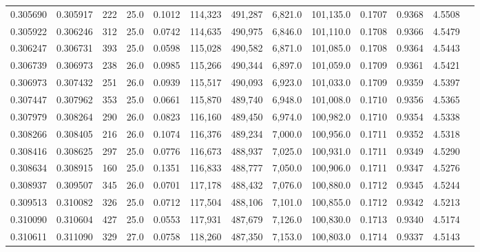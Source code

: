 \begin{tabular}{rrrrrrrrrrrrr}
0.305690 & 0.305917 &   222 & 25.0 &                                     0.1012 & 114,323 & 491,287 &   6,821.0 & 101,135.0 & 0.1707 & 0.9368 & 4.5508 \\
0.305922 & 0.306246 &   312 & 25.0 &                                     0.0742 & 114,635 & 490,975 &   6,846.0 & 101,110.0 & 0.1708 & 0.9366 & 4.5479 \\
0.306247 & 0.306731 &   393 & 25.0 &                                     0.0598 & 115,028 & 490,582 &   6,871.0 & 101,085.0 & 0.1708 & 0.9364 & 4.5443 \\
0.306739 & 0.306973 &   238 & 26.0 &                                     0.0985 & 115,266 & 490,344 &   6,897.0 & 101,059.0 & 0.1709 & 0.9361 & 4.5421 \\
0.306973 & 0.307432 &   251 & 26.0 &                                     0.0939 & 115,517 & 490,093 &   6,923.0 & 101,033.0 & 0.1709 & 0.9359 & 4.5397 \\
0.307447 & 0.307962 &   353 & 25.0 &                                     0.0661 & 115,870 & 489,740 &   6,948.0 & 101,008.0 & 0.1710 & 0.9356 & 4.5365 \\
0.307979 & 0.308264 &   290 & 26.0 &                                     0.0823 & 116,160 & 489,450 &   6,974.0 & 100,982.0 & 0.1710 & 0.9354 & 4.5338 \\
0.308266 & 0.308405 &   216 & 26.0 &                                     0.1074 & 116,376 & 489,234 &   7,000.0 & 100,956.0 & 0.1711 & 0.9352 & 4.5318 \\
0.308416 & 0.308625 &   297 & 25.0 &                                     0.0776 & 116,673 & 488,937 &   7,025.0 & 100,931.0 & 0.1711 & 0.9349 & 4.5290 \\
0.308634 & 0.308915 &   160 & 25.0 &                                     0.1351 & 116,833 & 488,777 &   7,050.0 & 100,906.0 & 0.1711 & 0.9347 & 4.5276 \\
0.308937 & 0.309507 &   345 & 26.0 &                                     0.0701 & 117,178 & 488,432 &   7,076.0 & 100,880.0 & 0.1712 & 0.9345 & 4.5244 \\
0.309513 & 0.310082 &   326 & 25.0 &                                     0.0712 & 117,504 & 488,106 &   7,101.0 & 100,855.0 & 0.1712 & 0.9342 & 4.5213 \\
0.310090 & 0.310604 &   427 & 25.0 &                                     0.0553 & 117,931 & 487,679 &   7,126.0 & 100,830.0 & 0.1713 & 0.9340 & 4.5174 \\
0.310611 & 0.311090 &   329 & 27.0 &                                     0.0758 & 118,260 & 487,350 &   7,153.0 & 100,803.0 & 0.1714 & 0.9337 & 4.5143 \\

\end{tabular}
